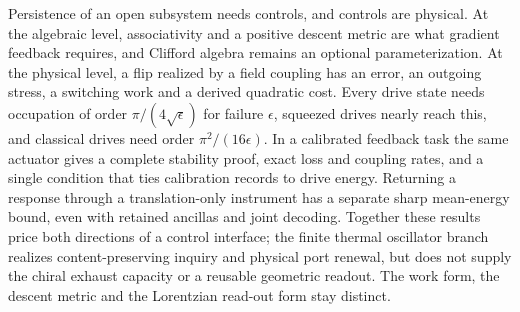 \documentclass[aps,pre,onecolumn,superscriptaddress,floatfix,longbibliography]{revtex4-2}
\begin{document}
Persistence of an open subsystem needs controls, and controls are physical. At the algebraic level, associativity and a positive descent metric are what gradient feedback requires, and Clifford algebra remains an optional parameterization. At the physical level, a flip realized by a field coupling has an error, an outgoing stress, a switching work and a derived quadratic cost. Every drive state needs occupation of order $\pi/(4\sqrt\epsilon)$ for failure $\epsilon$, squeezed drives nearly reach this, and classical drives need order $\pi^2/(16\epsilon)$. In a calibrated feedback task the same actuator gives a complete stability proof, exact loss and coupling rates, and a single condition that ties calibration records to drive energy. Returning a response through a translation-only instrument has a separate sharp mean-energy bound, even with retained ancillas and joint decoding. Together these results price both directions of a control interface; the finite thermal oscillator branch realizes content-preserving inquiry and physical port renewal, but does not supply the chiral exhaust capacity or a reusable geometric readout. The work form, the descent metric and the Lorentzian read-out form stay distinct.
\end{document}
